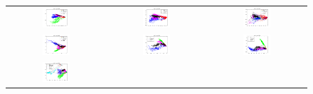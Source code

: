 \begin{figure}[!ht] \centering
  \begin{tabular}{ccc}
    \includegraphics[width=0.3\textwidth]{figs/data11} &
    \includegraphics[width=0.3\textwidth]{figs/data12} &
    \includegraphics[width=0.3\textwidth]{figs/data13} \\
    \includegraphics[width=0.3\textwidth]{figs/data21} &
    \includegraphics[width=0.3\textwidth]{figs/data22} &
    \includegraphics[width=0.3\textwidth]{figs/data23} \\
    \includegraphics[width=0.3\textwidth]{figs/data31} &

\end{tabular}
\end{figure}
